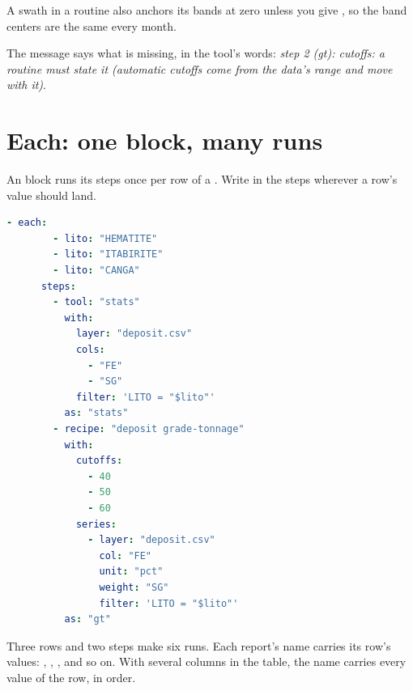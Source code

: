 A swath in a routine also anchors its bands at zero unless you give , so the band centers are the same every month.

The message says what is missing, in the tool's words: \emph{step 2 (gt): cutoffs: a routine must state it (automatic cutoffs come from the data’s range and move with it)}.

\section{Each: one block, many runs}\label{sec:routines-each}
An  block runs its steps once per row of a . Write  in the steps wherever a row's value should land.

\begin{lstlisting}[language=yaml]
    - each:
        - lito: "HEMATITE"
        - lito: "ITABIRITE"
        - lito: "CANGA"
      steps:
        - tool: "stats"
          with:
            layer: "deposit.csv"
            cols:
              - "FE"
              - "SG"
            filter: 'LITO = "$lito"'
          as: "stats"
        - recipe: "deposit grade-tonnage"
          with:
            cutoffs:
              - 40
              - 50
              - 60
            series:
              - layer: "deposit.csv"
                col: "FE"
                unit: "pct"
                weight: "SG"
                filter: 'LITO = "$lito"'
          as: "gt"
\end{lstlisting}

Three rows and two steps make six runs. Each report's name carries its row's values: , , , and so on. With several columns in the table, the name carries every value of the row, in order.


